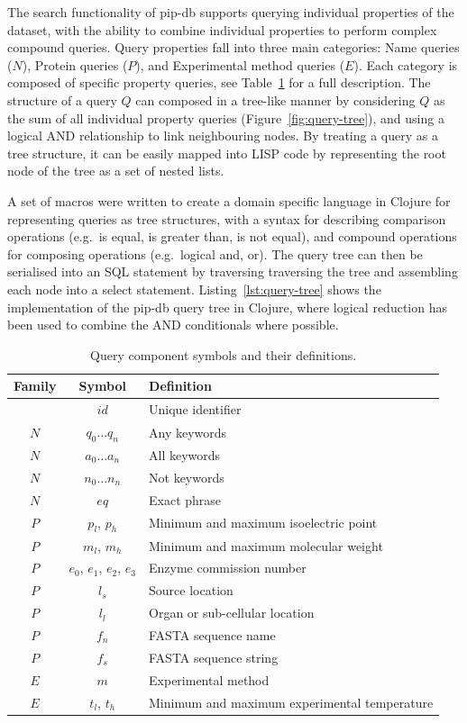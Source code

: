 The search functionality of pip-db supports querying individual
properties of the dataset, with the ability to combine individual
properties to perform complex compound queries. Query properties fall
into three main categories: Name queries ($N$), Protein queries ($P$),
and Experimental method queries ($E$). Each category is composed of
specific property queries, see Table~\ref{tab:query-components} for a
full description. The structure of a query $Q$ can composed in a
tree-like manner by considering $Q$ as the sum of all individual
property queries (Figure~\ref{fig:query-tree}), and using a logical
AND relationship to link neighbouring nodes. By treating a query as a
tree structure, it can be easily mapped into LISP code by representing
the root node of the tree as a set of nested
lists.

A set of macros were written to create a domain specific language in
Clojure for representing queries as tree structures, with a syntax for
describing comparison operations (e.g.\ is equal, is greater than, is
not equal), and compound operations for composing operations
(e.g.\ logical and, or). The query tree can then be serialised into an
SQL statement by traversing traversing the tree and assembling each
node into a select statement. Listing~\ref{lst:query-tree} shows the
implementation of the pip-db query tree in Clojure, where logical
reduction has been used to combine the AND conditionals where
possible.

\vspace{3cm}


\begin{table}[H]
\centering
\begin{tabular}{| c | c | l |}
\hline
\textbf{Family} & \textbf{Symbol} & \textbf{Definition}\\
\hline
& $id$ & Unique identifier\\
$N$ & $q_0 \ldots q_n$ & Any keywords\\
$N$ & $a_0 \ldots a_n$ & All keywords\\
$N$ & $n_0 \ldots n_n$ & Not keywords\\
$N$ & $eq$ & Exact phrase\\
$P$ & $p_l$, $p_h$ & Minimum and maximum isoelectric point\\
$P$ & $m_l$, $m_h$ & Minimum and maximum molecular weight\\
$P$ & $e_0$, $e_1$, $e_2$, $e_3$ & Enzyme commission number\\
$P$ & $l_s$ & Source location\\
$P$ & $l_l$ & Organ or sub-cellular location\\
$P$ & $f_n$ & FASTA sequence name\\
$P$ & $f_s$ & FASTA sequence string\\
$E$ & $m$ & Experimental method\\
$E$ & $t_l$, $t_h$ & Minimum and maximum experimental temperature\\
\hline
\end{tabular}
\caption[Query component symbols and their definitions]{Query component symbols and their definitions.}
\label{tab:query-components}
\end{table}


